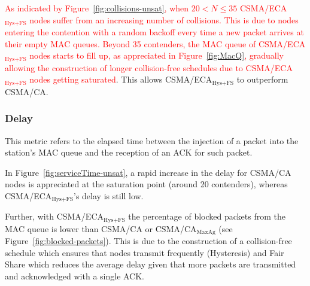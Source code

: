 	\textcolor{red}{As indicated by Figure~\ref{fig:collisions-unsat}, when $20<N\leq 35$ CSMA/ECA$_{\text{Hys+FS}}$ nodes suffer from an increasing number of  collisions. This is due to nodes entering the contention with a random backoff every time a new packet arrives at their empty MAC queues. Beyond 35 contenders, the MAC queue of CSMA/ECA$_{\text{Hys+FS}}$ nodes starts to fill up, as appreciated in Figure~\ref{fig:MacQ}, gradually allowing the construction of longer collision-free schedules due to CSMA/ECA$_{\text{Hys+FS}}$ nodes getting saturated}. This allows CSMA/ECA$_{\text{Hys+FS}}$ to outperform CSMA/CA.\\
		
	
	
	\subsubsection{Delay}
	
	
	This metric refers to the elapsed time between the injection of a packet into the station's MAC queue and the reception of an ACK for such packet. 
	
	In Figure~\ref{fig:serviceTime-unsat}, a rapid increase in the delay for CSMA/CA nodes is appreciated at the saturation point (around 20 contenders), whereas CSMA/ECA$_{\text{Hys+FS}}$'s delay is still low. 
	
	Further, with CSMA/ECA$_{\text{Hys+FS}}$ the percentage of blocked packets from the MAC queue is lower than CSMA/CA or CSMA/CA$_{\text{MaxAg}}$ (see Figure~\ref{fig:blocked-packets}). This is due to the construction of a collision-free schedule which ensures that nodes transmit frequently (Hysteresis) and Fair Share which reduces the average delay given that more packets are transmitted and acknowledged with a single ACK.
	
